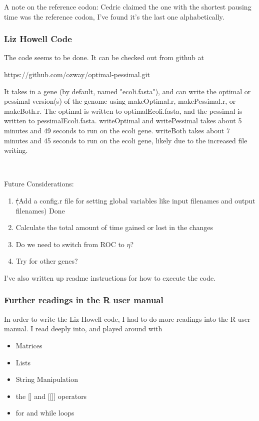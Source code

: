 A note on the reference codon: Cedric claimed the one with the shortest pausing time was the reference codon, I've found it's the last one alphabetically.



\subsubsection{Liz Howell Code}
The code seems to be done. It can be checked out from github at

https://github.com/ozway/optimal-pessimal.git

It takes in a gene (by default, named "ecoli.fasta"), and can write the optimal or pessimal version(s) of the genome using makeOptimal.r, makePessimal.r, or makeBoth.r. The optimal is written to optimalEcoli.fasta, and the pessimal is written to pessimalEcoli.fasta. writeOptimal and writePessimal takes about 5 minutes and 49 seconds to run on the ecoli gene. writeBoth takes about 7 minutes and 45 seconds to run on the ecoli gene, likely due to the increased file writing.

~

\noindent Future Considerations:
\begin{enumerate}
\item \sout(Add a config.r file for setting global variables like input filenames and output filenames) Done
\item Calculate the total amount of time gained or lost in the changes
\item Do we need to switch from ROC to $\eta$?
\item Try for other genes?
\end{enumerate}

I've also written up readme instructions for how to execute the code.


\subsubsection{Further readings in the R user manual}
In order to write the Liz Howell code, I had to do more readings into the R user manual. I read deeply into, and played around with
\begin{itemize}
\item Matrices
\item Lists
\item String Manipulation
\item the [] and [[]] operators
\item for and while loops
\end{itemize}

